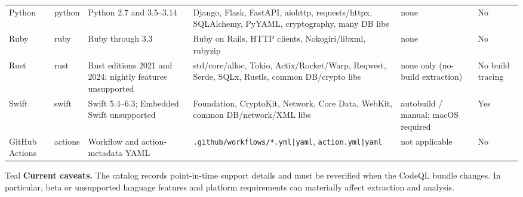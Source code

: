 \documentclass[10pt,letterpaper]{article}
\newcommand{\code}[1]{\texttt{\small #1}}
\begin{document}
\begin{landscape}
\begin{longtable}{@{}P{0.72in}P{0.9in}P{1.45in}P{3.55in}P{1.25in}P{0.65in}@{}}
Python & python & Python 2.7 and 3.5--3.14 & Django, Flask, FastAPI, aiohttp, requests/httpx, SQLAlchemy, PyYAML, cryptography, many DB libs & none & No\\
Ruby & ruby & Ruby through 3.3 & Ruby on Rails, HTTP clients, Nokogiri/libxml, rubyzip & none & No\\
Rust & rust & Rust editions 2021 and 2024; nightly features unsupported & std/core/alloc, Tokio, Actix/Rocket/Warp, Reqwest, Serde, SQLx, Rustls, common DB/crypto libs & none only (no-build extraction) & No build tracing\\
Swift & swift & Swift 5.4--6.3; Embedded Swift unsupported & Foundation, CryptoKit, Network, Core Data, WebKit, common DB/network/XML libs & autobuild / manual; macOS required & Yes\\
GitHub Actions & actions & Workflow and action-metadata YAML & \code{.github/workflows/*.yml|yaml}, \code{action.yml|yaml} & not applicable & No\\
\bottomrule
\end{longtable}
\normalsize
\begin{callout}{Teal}
\textbf{Current caveats.} The catalog records point-in-time support details and must be reverified when the CodeQL bundle changes. In particular, beta or unsupported language features and platform requirements can materially affect extraction and analysis.
\end{callout}
\end{landscape}
\end{document}
